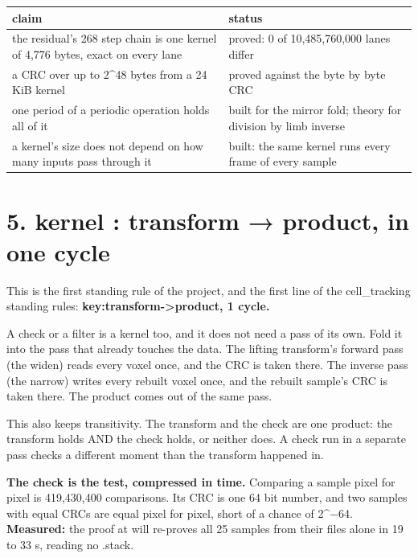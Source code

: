 {\small
\setlength{\tabcolsep}{6pt}
\begin{longtable}{>{\RaggedRight\arraybackslash}p{}>{\RaggedRight\arraybackslash}p{}}
\toprule
claim & status \\
\midrule
\endhead
the residual's 268 step chain is one kernel of 4,776 bytes, exact on every lane & proved: 0 of 10,485,760,000 lanes differ \\
a CRC over up to 2\textasciicircum{}48 bytes from a 24 KiB kernel & proved against the byte by byte CRC \\
one period of a periodic operation holds all of it & built for the mirror fold; theory for division by limb inverse \\
a kernel's size does not depend on how many inputs pass through it & built: the same kernel runs every frame of every sample \\
\bottomrule
\end{longtable}
}

\section{\texorpdfstring{5. kernel : transform → product, in one cycle}{5. kernel : transform → product, in one cycle}}

This is the first standing rule of the project, and the first line of the cell\_\allowbreak{}tracking standing rules: \textbf{key:transform->product, 1 cycle.}

A check or a filter is a kernel too, and it does not need a pass of its own. Fold it into the pass that already touches the data. The lifting transform's forward pass (the widen) reads every voxel once, and the CRC is taken there. The inverse pass (the narrow) writes every rebuilt voxel once, and the rebuilt sample's CRC is taken there. The product comes out of the same pass.

This also keeps transitivity. The transform and the check are one product: the transform holds AND the check holds, or neither does. A check run in a separate pass checks a different moment than the transform happened in.

\textbf{The check is the test, compressed in time.} Comparing a sample pixel for pixel is 419,430,400 comparisons. Its CRC is one 64 bit number, and two samples with equal CRCs are equal pixel for pixel, short of a chance of 2\textasciicircum{}−64. \textbf{Measured:} the proof at will re-proves all 25 samples from their files alone in 19 to 33 s, reading no .stack.


